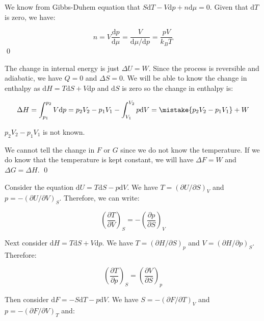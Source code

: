 \documentclass[12pt]{article}
\begin{document}
We know from Gibbs-Duhem equation that $S \mathrm{d}T - V \mathrm{d}p + n \mathrm{d}\mu = 0$. Given that $\mathrm{d}T$ is zero, we have:

\begin{equation}
    n = V \frac{\mathrm{d}p}{\mathrm{d}\mu} = \frac{V}{\mathrm{d}\mu/\mathrm{d}p} = \frac{pV}{k_{B}T}
\end{equation}
\qed


The change in internal energy is just $\Delta U = W$. Since the process is reversible and adiabatic, we have $Q = 0$ and $\Delta S = 0$. We will be able to know the change in enthalpy as $\mathrm{d}H = T \mathrm{d}S + V \mathrm{d}p$ and $\mathrm{d}S$ is zero so the change in enthalpy is:

\begin{equation}
    \Delta H = \int_{p_{1}}^{p_{2}} V \mathrm{d}p = p_{2} V_{2} - p_{1} V_{1} - \int_{V_{1}}^{V_{2}} p \mathrm{d}V = \mistake{p_{2} V_{2} - p_{1} V_{1}} + W
\end{equation}

\begin{correction}
    $p_{2} V_{2} - p_{1} V_{1}$ is not known.
\end{correction}

We cannot tell the change in $F$ or $G$ since we do not know the temperature. If we do know that the temperature is kept constant, we will have $\Delta F = W$ and $\Delta G = \Delta H$.
\qed


Consider the equation $\mathrm{d}U = T \mathrm{d}S - p \mathrm{d}V$. We have $T = (\partial U / \partial S)_{V}$ and $p = -(\partial U / \partial V)_{S}$. Therefore, we can write:

\begin{equation}
    \left(  \frac{\partial T}{\partial V} \right)_{S} = -\left( \frac{\partial p}{\partial S} \right)_{V}
\end{equation}

Next consider $\mathrm{d}H = T \mathrm{d}S + V \mathrm{d}p$. We have $T = (\partial H / \partial S)_{p}$ and $V = (\partial H / \partial p)_{S}$. Therefore:

\begin{equation}
    \left( \frac{\partial T}{\partial p} \right)_{S} = \left( \frac{\partial V}{\partial S} \right)_{p}
\end{equation}

Then consider $\mathrm{d}F = -S \mathrm{d}T - p \mathrm{d}V$. We have $S = -(\partial F / \partial T)_{V}$ and $p = -(\partial F / \partial V)_{T}$ and:
\end{document}
